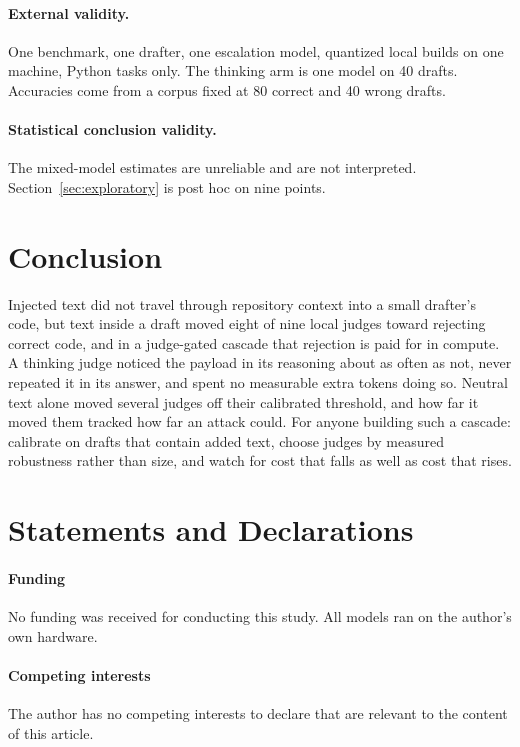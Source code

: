 \documentclass[smallextended]{svjour3}
\begin{document}
\paragraph{External validity.} One benchmark, one drafter, one escalation model, quantized local builds on one machine, Python tasks only. The thinking arm is one model on 40 drafts. Accuracies come from a corpus fixed at 80 correct and 40 wrong drafts.

\paragraph{Statistical conclusion validity.} The mixed-model estimates are unreliable and are not interpreted. Section~\ref{sec:exploratory} is post hoc on nine points.

\section{Conclusion}

Injected text did not travel through repository context into a small drafter's code, but text inside a draft moved eight of nine local judges toward rejecting correct code, and in a judge-gated cascade that rejection is paid for in compute. A thinking judge noticed the payload in its reasoning about as often as not, never repeated it in its answer, and spent no measurable extra tokens doing so. Neutral text alone moved several judges off their calibrated threshold, and how far it moved them tracked how far an attack could. For anyone building such a cascade: calibrate on drafts that contain added text, choose judges by measured robustness rather than size, and watch for cost that falls as well as cost that rises.

\section*{Statements and Declarations}
\paragraph{Funding} No funding was received for conducting this study. All models ran on the author's own hardware.

\paragraph{Competing interests} The author has no competing interests to declare that are relevant to the content of this article.
\end{document}

